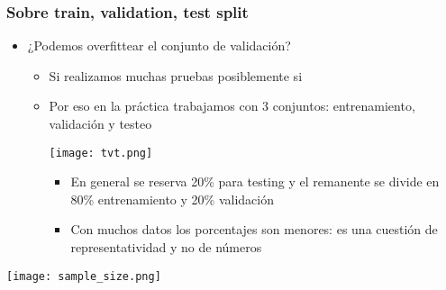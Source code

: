 \documentclass[leqno, 10pt, envcountsect]{beamer}
\numberwithin{equation}{section}
\theoremstyle{definition}
\theoremstyle{example}
\numberwithin{figure}{section}
\numberwithin{table}{section}
\let\olditem\item
\renewcommand{\item}{%
\olditem\vspace{1pt}}
\begin{document}
\begin{frame}[fragile=singleslide]
  \frametitle{Sobre train, validation, test split}
  \begin{itemize}
    \item ¿Podemos overfittear el conjunto de validación?
      \begin{itemize}
        \item Si realizamos muchas pruebas posiblemente si
        \item Por eso en la práctica trabajamos con 3 conjuntos:
          entrenamiento, validación y testeo
        \begin{center}
          \texttt{[image: tvt.png]}
        \end{center}
        \begin{itemize}
          \item En general se reserva 20\% para testing y el remanente se
            divide en 80\% entrenamiento y 20\% validación
          \item Con muchos datos los porcentajes son menores: es una cuestión
            de representatividad y no de números
          \nocite{james13}\nocite{efron16}
        \end{itemize}
      \end{itemize}
  \end{itemize}
  \begin{center}
    \texttt{[image: sample\_size.png]}
  \end{center}
\end{frame}
\end{document}
